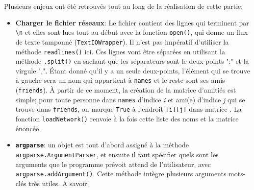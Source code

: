 \documentclass[11pt,a4paper]{article}
\begin{document}
Plusieurs enjeux ont été retrouvés tout au long de la réalisation de cette partie:

\begin{itemize}
\item \textbf{Charger le fichier réseaux}: Le fichier contient des lignes qui
  terminent par \texttt{\textbackslash n} et elles sont lues tout au début avec
  la fonction \texttt{open()}, qui donne un flux de texte tamponné
  (\texttt{TextIOWrapper}). Il n'est pas impératif d'utiliser la méthode
  \texttt{readlines()} ici. Ces lignes vont être séparées en utilisant la
  méthode \texttt{.split()} en sachant que les séparateurs sont le deux-points
  ":" et la virgule ",". Étant donné qu'il y a un seule deux-points, l'élément qui se trouve à gauche sera un nom qui appartient à \texttt{names} et le reste sont ses amis (\texttt{friends}). À partir de ce moment, la création de la matrice d'amitiés est simple; pour toute personne dans \texttt{names} d'indice \emph{i} et ami(e) d'indice \emph{j} qui se trouve dans \texttt{friends}, on marque \texttt{True} à l'endroit \texttt{[i][j]} dans matrice . La fonction \texttt{loadNetwork()} renvoie à la fois cette liste des noms et la matrice énoncée.

\item \texttt{\textbf{argparse}}: un objet est tout d'abord assigné à la méthode \texttt{argparse.ArgumentParser}, et ensuite il faut spécifier quels sont les arguments que le programme prévoit attend de l'utilisateur, avec \texttt{argparse.addArgument()}. Cette méthode intègre plusieurs arguments mots-clés très utiles. A savoir:



\end{itemize}
\end{document}
